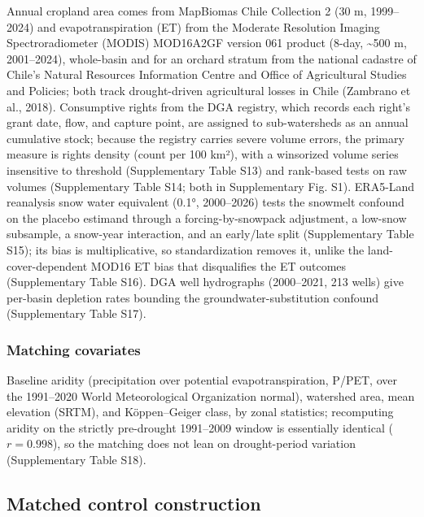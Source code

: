 \documentclass[
]{agujournal2019}
\begin{document}
Annual cropland area comes from MapBiomas Chile Collection 2 (30 m,
1999--2024) and evapotranspiration (ET) from the Moderate Resolution
Imaging Spectroradiometer (MODIS) MOD16A2GF version 061 product (8-day,
\textasciitilde500 m, 2001--2024), whole-basin and for an orchard
stratum from the national cadastre of Chile's Natural Resources
Information Centre and Office of Agricultural Studies and Policies; both
track drought-driven agricultural losses in Chile (Zambrano et al.,
2018). Consumptive rights from the DGA registry, which records each
right's grant date, flow, and capture point, are assigned to
sub-watersheds as an annual cumulative stock; because the registry
carries severe volume errors, the primary measure is rights density
(count per 100 km²), with a winsorized volume series insensitive to
threshold (Supplementary Table S13) and rank-based tests on raw volumes
(Supplementary Table S14; both in Supplementary Fig. S1). ERA5-Land
reanalysis snow water equivalent (0.1°, 2000--2026) tests the snowmelt
confound on the placebo estimand through a forcing-by-snowpack
adjustment, a low-snow subsample, a snow-year interaction, and an
early/late split (Supplementary Table S15); its bias is multiplicative,
so standardization removes it, unlike the land-cover-dependent MOD16 ET
bias that disqualifies the ET outcomes (Supplementary Table S16). DGA
well hydrographs (2000--2021, 213 wells) give per-basin depletion rates
bounding the groundwater-substitution confound (Supplementary Table
S17).

\subsubsection{Matching covariates}\label{matching-covariates}

Baseline aridity (precipitation over potential evapotranspiration,
P/PET, over the 1991--2020 World Meteorological Organization normal),
watershed area, mean elevation (SRTM), and Köppen--Geiger class, by
zonal statistics; recomputing aridity on the strictly pre-drought
1991--2009 window is essentially identical (\(r = 0.998\)), so the
matching does not lean on drought-period variation (Supplementary Table
S18).

\subsection{Matched control
construction}\label{matched-control-construction}
\end{document}
